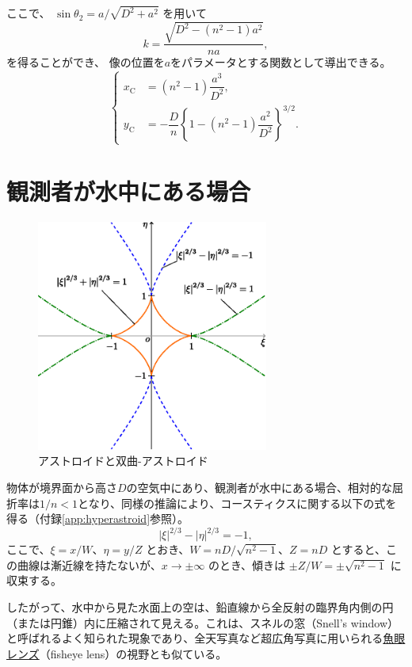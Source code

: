 \documentclass[twocolumn]{article}
\begin{document}
ここで、
$\sin\theta_2 = {a}/{\sqrt{D^2+a^2}}$
を用いて
$$k = \dfrac{\sqrt{D^2-(n^2-1)a^2}}{na},$$
を得ることができ、
像の位置を$a$をパラメータとする関数として導出できる。
$$ \left\{ 
\begin{aligned}
	x_{\mathrm{C}}^{} &= (n^2-1)\dfrac{a^3}{D^2},\\
	y_{\mathrm{C}}^{}
	&= -\dfrac{D}{n}\left\{ 1-(n^2-1)\dfrac{a^2}{D^2} \right\}^{3/2}.
\end{aligned}
\right.$$
	
\section{観測者が水中にある場合}

\begin{figure}
	\centering
	\includegraphics[width=3in]{figs/g254.eps}
	\caption{アストロイドと双曲-アストロイド}
	\label{fig:hyperastroid}
\end{figure}

物体が境界面から高さ$D$の空気中にあり、観測者が水中にある場合、相対的な屈折率は$1/n < 1$となり、同様の推論により、コースティクスに関する以下の式を得る（付録\ref{app:hyperastroid}参照）。
$$ \left| \xi \right|^{2/3} - \left| \eta \right|^{2/3} = -1, $$
ここで、$\xi = {x}/{W} $、$\eta = {y}/{Z}$ とおき、$W = {nD}/{\sqrt{n^2-1}}$、$Z = nD$ とすると、この曲線は漸近線を持たないが、$x \to \pm \infty$ のとき、傾きは $\pm Z/W = \pm \sqrt{n^2-1}$ に収束する。

したがって、水中から見た水面上の空は、鉛直線から全反射の臨界角内側の円（または円錐）内に圧縮されて見える。これは、スネルの窓（Snell's window）と呼ばれるよく知られた現象であり、全天写真など超広角写真に用いられる\href{https://ja.wikipedia.org/wiki/%E9%AD%9A%E7%9C%BC%E3%83%AC%E3%83%B3%E3%82%BA}{魚眼レンズ}（fisheye lens）の視野とも似ている。
\end{document}
